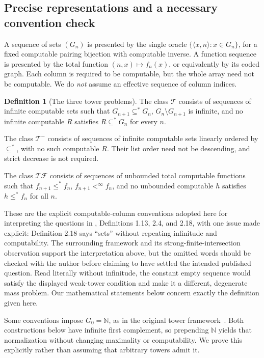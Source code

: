 \documentclass[11pt,a4paper]{article}
\newcommand{\N}{\mathbb N}
\newcommand{\T}{\mathcal T}\newcommand{\TF}{\mathcal{TF}}\newcommand{\Tw}{\mathcal T^{-}}
\newcommand{\substar}{\subseteq^{*}}\newcommand{\lestar}{\leq^{*}}
\newcommand{\pair}[2]{\langle#1,#2\rangle}
\theoremstyle{definition}\newtheorem{definition}[theorem]{Definition}
\theoremstyle{remark}\newtheorem{remark}[theorem]{Remark}
\begin{document}
\subsection{Precise representations and a necessary convention check}
A sequence of sets $(G_n)$ is presented by the single oracle
$\{\pair{x}{n}:x\in G_n\}$, for a fixed computable pairing bijection with
computable inverse. A function sequence is presented by the total function
$(n,x)\mapsto f_n(x)$, or equivalently by its coded graph. Each column is
required to be computable, but the whole array need not be computable. We do
\emph{not} assume an effective sequence of column indices.

\begin{definition}[The three tower problems]
The class $\T$ consists of sequences of infinite computable sets such that
$G_{n+1}\substar G_n$, $G_n\setminus G_{n+1}$ is infinite, and no infinite
computable $R$ satisfies $R\substar G_n$ for every $n$.

The class $\Tw$ consists of sequences of infinite computable sets linearly
ordered by $\substar$, with no such computable $R$. Their list order need not
be descending, and strict decrease is not required.

The class $\TF$ consists of sequences of unbounded total computable functions
such that $f_{n+1}\lestar f_n$, $f_{n+1}<^\infty f_n$, and no unbounded
computable $h$ satisfies $h\lestar f_n$ for all $n$.
\end{definition}
These are the explicit computable-column conventions adopted here for interpreting the questions in
\cite{McDonald}, Definitions 1.13, 2.4, and 2.18, with one issue made explicit:
Definition 2.18 says ``sets'' without repeating infinitude and computability.
The surrounding framework and its strong-finite-intersection observation
support the interpretation above, but the omitted words should be checked
with the author before claiming to have settled the intended published
question. Read literally without infinitude, the constant empty sequence
would satisfy the displayed weak-tower condition and make it a different,
degenerate mass problem. Our mathematical statements below concern exactly
the definition given here.

Some conventions impose $G_0=\N$, as in the original tower
framework~\cite{LMNS}. Both constructions below have infinite first
complement, so prepending $\N$ yields that normalization without changing
maximality or computability. We prove this explicitly rather than assuming
that arbitrary towers admit it.
\end{document}

